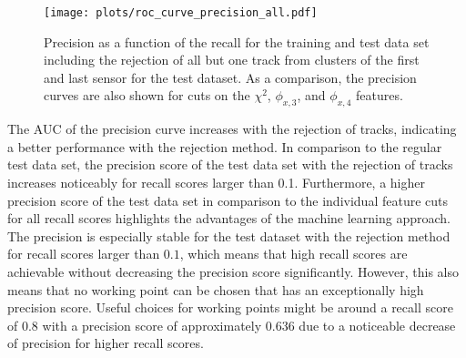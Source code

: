 
\begin{figure}[H]
  \centering
  \texttt{[image: plots/roc\_curve\_precision\_all.pdf]}
  \caption{Precision as a function of the recall for the training and test data set including the rejection of all but one track from clusters of the first and last
           sensor for the test dataset. As a comparison, the precision curves are also shown for cuts on the $\chi^2$, $\phi_{x,3}$, and $\phi_{x,4}$ features.}
  \label{fig:precision}
\end{figure}
The AUC of the precision curve increases with the rejection of tracks,
indicating a better performance with the rejection method. In comparison to the regular test data set, the precision score
of the test data set with the rejection of tracks increases noticeably for recall scores larger than 0.1.
Furthermore, a higher precision score of the test data set in comparison to the individual feature cuts for all recall scores highlights the advantages of the machine
learning approach. The precision is especially stable for the test dataset with the rejection method for recall scores larger than $0.1$,
which means that high recall scores
are achievable without decreasing the precision score significantly.
However, this also means that no working point can be chosen that has an exceptionally high precision score. Useful choices for working points might be around
a recall score of $0.8$ with a precision score of approximately $0.636$ due to a noticeable decrease of precision for higher recall scores.

